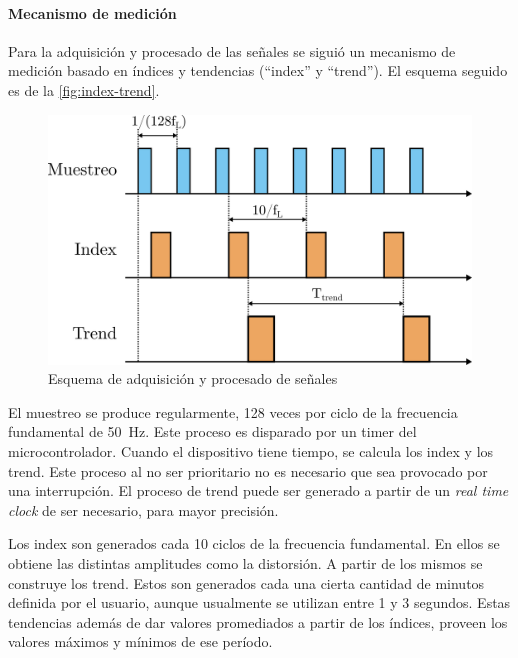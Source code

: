 \documentclass[../et.tex]{subfiles}
\begin{document}
\paragraph{Mecanismo de medición}
Para la adquisición y procesado de las señales se siguió un mecanismo de medición basado en índices y tendencias (``index'' y ``trend''). El esquema seguido es de la \autoref{fig:index-trend}.

    \begin{figure}[!htbp]
        \centering
        \includegraphics[scale=1.2]{diagrams/index-trend.png}
        \caption{Esquema de adquisición y procesado de señales}
        \label{fig:index-trend}
    \end{figure}

El muestreo se produce regularmente, 128 veces por ciclo de la frecuencia fundamental de \SI{50}{Hz}. Este proceso es disparado por un timer del microcontrolador. Cuando el dispositivo tiene tiempo, se calcula los index y los trend. Este proceso al no ser prioritario no es necesario que sea provocado por una interrupción. El proceso de trend puede ser generado a partir de un \emph{real time clock} de ser necesario, para mayor precisión.

Los index son generados cada 10 ciclos de la frecuencia fundamental. En ellos se obtiene las distintas amplitudes como la distorsión. A partir de los mismos se construye los trend. Estos son generados cada una cierta cantidad de minutos definida por el usuario, aunque usualmente se utilizan entre 1 y 3 segundos. Estas tendencias además de dar valores promediados a partir de los índices, proveen los valores máximos y mínimos de ese período.
\end{document}
